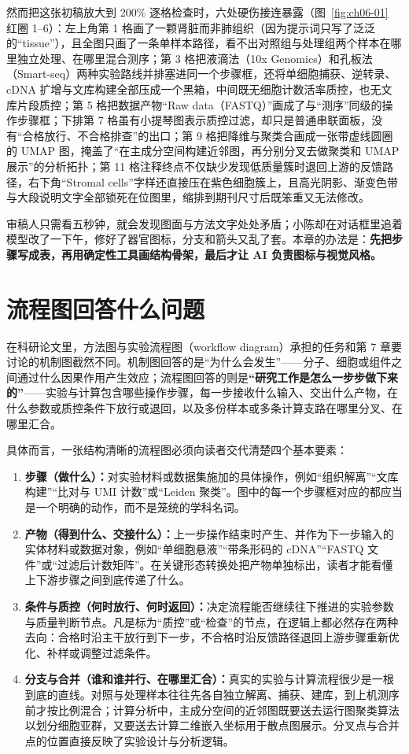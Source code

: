 然而把这张初稿放大到 200\% 逐格检查时，六处硬伤接连暴露（图~\ref{fig:ch06-01} 红圈 1–6）：左上角第 1 格画了一颗肾脏而非肺组织（因为提示词只写了泛泛的“tissue”），且全图只画了一条单样本路径，看不出对照组与处理组两个样本在哪里独立处理、在哪里混合测序；第 3 格把液滴法（10x Genomics）和孔板法（Smart-seq）两种实验路线并排塞进同一个步骤框，还将单细胞捕获、逆转录、cDNA 扩增与文库构建全部压成一个黑箱，中间既无细胞计数活率质控，也无文库片段质控；第 5 格把数据产物“Raw data（FASTQ）”画成了与“测序”同级的操作步骤框；下排第 7 格虽有小提琴图表示质控过滤，却只是普通串联面板，没有“合格放行、不合格排查”的出口；第 9 格把降维与聚类合画成一张带虚线圆圈的 UMAP 图，掩盖了“在主成分空间构建近邻图，再分别分叉去做聚类和 UMAP 展示”的分析拓扑；第 11 格注释终点不仅缺少发现低质量簇时退回上游的反馈路径，右下角“Stromal cells”字样还直接压在紫色细胞簇上，且高光阴影、渐变色带与大段说明文字全部锁死在位图里，缩排到期刊尺寸后既笨重又无法修改。

审稿人只需看五秒钟，就会发现图面与方法文字处处矛盾；小陈却在对话框里追着模型改了一下午，修好了器官图标，分支和箭头又乱了套。本章的办法是：\textbf{先把步骤写成表，再用确定性工具画结构骨架，最后才让 AI 负责图标与视觉风格。}

\section{流程图回答什么问题}

在科研论文里，方法图与实验流程图（workflow diagram）承担的任务和第 7 章要讨论的机制图截然不同。机制图回答的是“为什么会发生”——分子、细胞或组件之间通过什么因果作用产生效应；流程图回答的则是\textbf{“研究工作是怎么一步步做下来的”}——实验与计算包含哪些操作步骤，每一步接收什么输入、交出什么产物，在什么参数或质控条件下放行或退回，以及多份样本或多条计算支路在哪里分叉、在哪里汇合。

具体而言，一张结构清晰的流程图必须向读者交代清楚四个基本要素：
\begin{enumerate}
\item \textbf{步骤（做什么）：}对实验材料或数据集施加的具体操作，例如“组织解离”“文库构建”“比对与 UMI 计数”或“Leiden 聚类”。图中的每一个步骤框对应的都应当是一个明确的动作，而不是笼统的学科名词。
\item \textbf{产物（得到什么、交接什么）：}上一步操作结束时产生、并作为下一步输入的实体材料或数据对象，例如“单细胞悬液”“带条形码的 cDNA”“FASTQ 文件”或“过滤后计数矩阵”。在关键形态转换处把产物单独标出，读者才能看懂上下游步骤之间到底传递了什么。
\item \textbf{条件与质控（何时放行、何时返回）：}决定流程能否继续往下推进的实验参数与质量判断节点。凡是标为“质控”或“检查”的节点，在逻辑上都必然存在两种去向：合格时沿主干放行到下一步，不合格时沿反馈路径退回上游步骤重新优化、补样或调整过滤条件。
\item \textbf{分支与合并（谁和谁并行、在哪里汇合）：}真实的实验与计算流程很少是一根到底的直线。对照与处理样本往往先各自独立解离、捕获、建库，到上机测序前才按比例混合；计算分析中，主成分空间的近邻图既要送去运行图聚类算法以划分细胞亚群，又要送去计算二维嵌入坐标用于散点图展示。分叉点与合并点的位置直接反映了实验设计与分析逻辑。
\end{enumerate}

